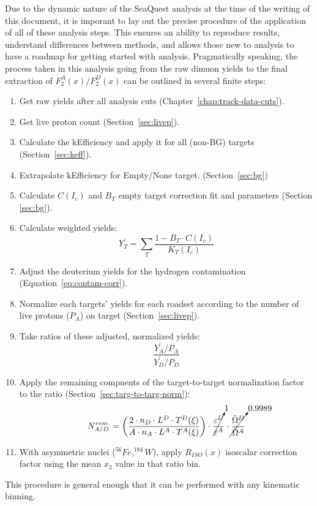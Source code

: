 Due to the dynamic nature of the SeaQuest analysis at the time of the writing of this document, it is imporant to lay out the precise procedure of the application of all of these analysis steps. This ensures an ability to reproduce results, understand differences between methods, and allows those new to analysis to have a roadmap for getting started with analysis. Pragmatically speaking, the process taken in this analysis going from the raw dimuon yields to the final extraction of $F_2^A(x)/F_2^D(x)$ can be outlined in several finite steps:
\begin{enumerate}
	\item Get raw yields after all analysis cuts (Chapter~\ref{chap:track-data-cuts}).
	\item Get live proton count (Section~\ref{sec:livep}).
	\item Calculate the kEfficiency and apply it for all (non-BG) targets (Section~\ref{sec:keff}).
	\item Extrapolate kEfficiency for Empty/None target. (Section~\ref{sec:bg})
	\item Calculate $C(I_c)$ and $B_T$ empty target correction fit and parameters (Section \ref{sec:bg}).
	\item Calculate weighted yields:
	\begin{equation}
	Y_T^\prime = \sum\limits_T \frac{1 - B_T \cdot C(I_c)}{K_T(I_c)}
	\end{equation}
	\item Adjust the deuterium yields for the hydrogen contamination (Equation~\ref{eq:contam-corr}).
	\item Normalize each targets' yields for each roadset according to the number of live protons ($P_A$) on target (Section~\ref{sec:livep}).
	\item Take ratios of these adjusted, normalized yields:
	\begin{equation}
		\frac{Y_A^\prime / P_A}{Y_D^\prime / P_D}
	\end{equation}
	\item Apply the remaining compnents of the target-to-target normalization factor to the ratio (Section~\ref{sec:targ-to-targ-norm}):
	\begin{equation}
	N^{rem.}_{A/D} =
	\left( \frac{ 2 \cdot n_D \cdot L^D \cdot T^D(\xi)}{ A \cdot n_A \cdot L^A \cdot T^A(\xi)} \right) \cdot 
	\cancelto{1}{\frac{ \varepsilon^D }{ \varepsilon^A }}  \cdot 
	\cancelto{0.9989}{\frac{ \bar{\Omega}^D }{\bar{ \Omega}^A }}
	\end{equation}
	\item With asymmetric nuclei ($^{56}Fe, ^{184}W$), apply $R_{ISO}(x)$ isoscalar correction factor using the mean $x_2$ value in that ratio bin.
\end{enumerate}
This procedure is general enough that it can be performed with any kinematic binning.

